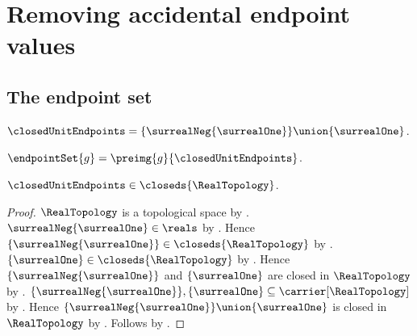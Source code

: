 




\section{Removing accidental endpoint values}

\subsection{The endpoint set}

\begin{definition}\label{closed_unit_endpoints}
    $\closedUnitEndpoints
        =\{\surrealNeg{\surrealOne}\}\union\{\surrealOne\}$.
\end{definition}

\begin{definition}\label{endpoint_set}
    $\endpointSet{g}=\preimg{g}{\closedUnitEndpoints}$.
\end{definition}

\begin{theorem}\label{closed_unit_endpoints_is_closed}
    $\closedUnitEndpoints\in\closeds{\RealTopology}$.
\end{theorem}
\begin{proof}
    $\RealTopology$ is a topological space
        by .
    $\surrealNeg{\surrealOne}\in\reals$
        by
        .
    Hence $\{\surrealNeg{\surrealOne}\}\in\closeds{\RealTopology}$
        by .
    $\{\surrealOne\}\in\closeds{\RealTopology}$
        by .
    Hence $\{\surrealNeg{\surrealOne}\}$ and $\{\surrealOne\}$
        are closed in $\RealTopology$ by .
    $\{\surrealNeg{\surrealOne}\},\{\surrealOne\}
        \subseteq\carrier[\RealTopology]$
        by .
    Hence
        $\{\surrealNeg{\surrealOne}\}\union\{\surrealOne\}$
            is closed in $\RealTopology$
        by .
    Follows by .
\end{proof}

